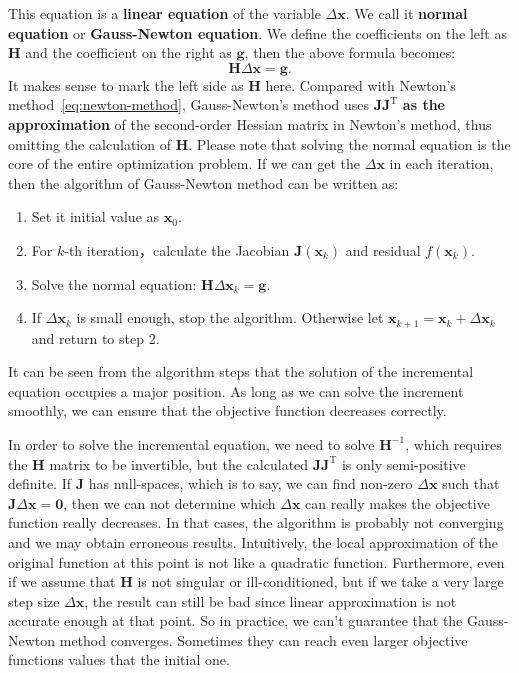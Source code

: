This equation is a \textbf{linear equation} of the variable $\Delta \bm{x}$. We call it \textbf{normal equation} or \textbf{Gauss-Newton equation}. We define the coefficients on the left as $\bm{H}$ and the coefficient on the right as $\bm{g}$, then the above formula becomes:
\begin{equation}
    \label{eq:minimize-deltax}
    \bm{H} \Delta \bm{x} = \bm{g}.
\end{equation}
It makes sense to mark the left side as $\bm{H}$ here. Compared with Newton's method~\ref{eq:newton-method}, Gauss-Newton's method uses $\bm{J}\bm{J}^\mathrm{T}$ \textbf{as the approximation} of the second-order Hessian matrix in Newton's method, thus omitting the calculation of $\bm{H}$. Please note that solving the normal equation is the core of the entire optimization problem. If we can get the $\Delta \bm{x}$ in each iteration, then the algorithm of Gauss-Newton method can be written as:

\begin{mdframed}
    \begin{enumerate}
        \item Set it initial value as $\bm{x}_0$.
        \item For $k$-th iteration，calculate the Jacobian $\bm{J}(\bm{x}_k)$ and residual $f(\bm{x}_k)$.
        \item Solve the normal equation: $\bm{H} \Delta \bm{x}_k = \bm{g}$.
        \item If $\Delta \bm{x}_k$ is small enough, stop the algorithm. Otherwise let $\bm{x}_{k+1} = \bm{x}_k+\Delta \bm{x}_k$ and return to step 2.
    \end{enumerate}
\end{mdframed}

It can be seen from the algorithm steps that the solution of the incremental equation occupies a major position. As long as we can solve the increment smoothly, we can ensure that the objective function decreases correctly.

In order to solve the incremental equation, we need to solve $\bm{H}^{-1}$, which requires the $\bm{H}$ matrix to be invertible, but the calculated $\bm{J} \bm{ J}^\mathrm{T}$ is only semi-positive definite. If $\bm{J}$ has null-spaces, which is to say, we can find non-zero $\Delta \bm{x}$ such that $\bm{J} \Delta\bm{x} = \bm{0}$, then we can not determine which $\Delta \bm{x}$ can really makes the objective function really decreases. In that cases, the algorithm is probably not converging and we may obtain erroneous results. Intuitively, the local approximation of the original function at this point is not like a quadratic function. Furthermore, even if we assume that $\bm{H}$ is not singular or ill-conditioned, but if we take a very large step size $\Delta \bm{x}$, the result can still be bad since linear approximation is not accurate enough at that point. So in practice, we can't guarantee that the Gauss-Newton method converges. Sometimes they can reach even larger objective functions values that the initial one. 

